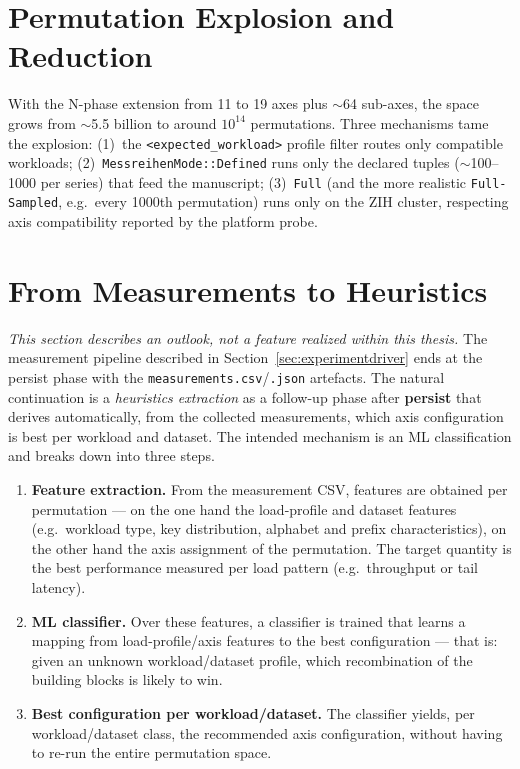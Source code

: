 \section{Permutation Explosion and Reduction}\label{sec:explosion}

With the N-phase extension from 11 to 19 axes plus $\sim$64 sub-axes, the space grows from $\sim$5.5
billion to around $10^{14}$ permutations. Three mechanisms tame the explosion: (1)~the
\texttt{<expected\_workload>} profile filter routes only compatible workloads;
(2)~\texttt{MessreihenMode::Defined} runs only the declared tuples ($\sim$100--1000 per series) that
feed the manuscript; (3)~\texttt{Full} (and the more realistic \texttt{Full-Sampled}, e.g.\ every
1000th permutation) runs only on the ZIH cluster, respecting axis compatibility reported by the
platform probe.

\section{From Measurements to Heuristics}\label{sec:measurements-to-heuristics}

\emph{This section describes an outlook, not a feature realized within this thesis.} The measurement
pipeline described in Section~\ref{sec:experimentdriver} ends at the persist phase with the
\texttt{measurements.csv}/\texttt{.json} artefacts. The natural continuation is a
\emph{heuristics extraction} as a follow-up phase after \textbf{persist} that derives automatically,
from the collected measurements, which axis configuration is best per workload and dataset. The
intended mechanism is an ML classification and breaks down into three steps.

\begin{enumerate}
  \item \textbf{Feature extraction.} From the measurement CSV, features are obtained per permutation
  --- on the one hand the load-profile and dataset features (e.g.\ workload type, key distribution,
  alphabet and prefix characteristics), on the other hand the axis assignment of the permutation.
  The target quantity is the best performance measured per load pattern (e.g.\ throughput or tail
  latency).
  \item \textbf{ML classifier.} Over these features, a classifier is trained that learns a mapping
  from load-profile/axis features to the best configuration --- that is: given an unknown
  workload/dataset profile, which recombination of the building blocks is likely to win.
  \item \textbf{Best configuration per workload/dataset.} The classifier yields, per
  workload/dataset class, the recommended axis configuration, without having to re-run the entire
  permutation space.
\end{enumerate}

